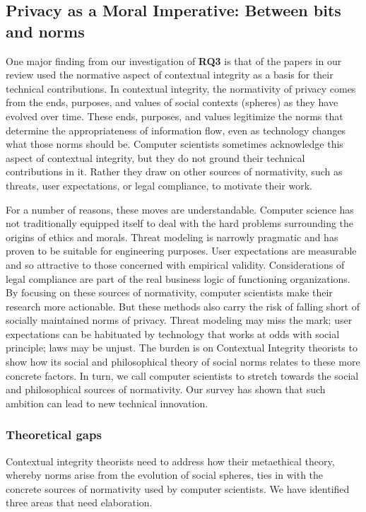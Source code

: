 \documentclass[../thesis.tex]{subfiles}
\begin{document}
\subsection{Privacy as a Moral Imperative: Between bits and norms}
\label{CI5.3}

One major finding from our investigation of
\textbf{RQ3} is that of the papers in
our review used the normative aspect of contextual integrity as a basis
for their technical contributions. In contextual integrity, the
normativity of privacy comes from the ends, purposes, and values of
social contexts (spheres) as they have evolved over time. These ends,
purposes, and values legitimize the norms that determine the
appropriateness of information flow, even as technology changes what
those norms should be. Computer scientists sometimes acknowledge this
aspect of contextual integrity, but they do not ground their technical
contributions in it. Rather they draw on other sources of normativity,
such as threats, user expectations, or legal compliance, to motivate
their work.

For a number of reasons, these moves are understandable. Computer
science has not traditionally equipped itself to deal with the hard
problems surrounding the origins of ethics and morals. Threat modeling
is narrowly pragmatic and has proven to be suitable for engineering
purposes. User expectations are measurable and so attractive to those
concerned with empirical validity. Considerations of legal compliance
are part of the real business logic of functioning organizations. By
focusing on these sources of normativity, computer scientists make
their research more actionable. But these methods also carry the risk
of falling short of socially maintained norms of privacy. Threat
modeling may miss the mark; user expectations can be habituated by
technology that works at odds with social principle; laws may be
unjust. The burden is on Contextual Integrity theorists to show how its
social and philosophical theory of social norms relates to these more
concrete factors. In turn, we call computer scientists to stretch
towards the social and philosophical sources of normativity. Our survey
has shown that such ambition can lead to new technical innovation.

\subsubsection{Theoretical gaps}
\label{CI5.3.1}

Contextual integrity theorists need to address how their metaethical
theory, whereby norms arise from the evolution of social spheres, ties
in with the concrete sources of normativity used by computer
scientists. We have identified three areas that need elaboration.
\end{document}

